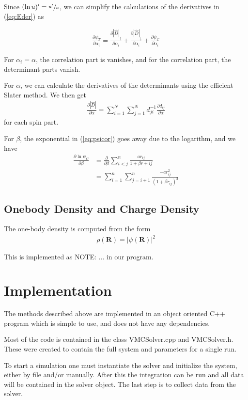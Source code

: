 \documentclass[twocolumns, a4paper,11pt,fleqn]{extarticle}
\newcommand{\eq}[1]{{\small\begin{align*}#1\end{align*}}}
\renewcommand\vec[1]{\boldsymbol{\mathbf{#1}}}
\newcommand{\op}[1]{\hat{#1}}
\begin{document}
Since $(\ln u)' = \sfrac{u'}{u}$, we can simplify the calculations of the derivatives
in (\ref{eq:Eder}) as

\eq{
  \frac{\partial \psi_T}{\partial \alpha_i}
  =\frac{\partial |\op D|_{\uparrow}}{\partial \alpha_i}
  +\frac{\partial |\op D|_{\downarrow}}{\partial \alpha_i}
  +\frac{\partial \psi_C}{\partial \alpha_i}
}

For $\alpha_i = \alpha$, the correlation part is vanishes,
and for the correlation part, the determinant parts vanish.

For $\alpha$, we can calculate the derivatives of the determinants 
using the efficient Slater method.
We then get
\eq{
  \frac{\partial|\op D|}{\partial \alpha}
  =\sum_{i=1}^N \sum_{j=1}^N  d_{ji}^{-1}\frac{\partial d_{ij}}{\partial \alpha}
}
for each spin part.

For $\beta$, the exponential in (\ref{eq:psicor}) 
goes away due to the logarithm, and we have
\eq{
  \frac{\partial \ln \psi_C}{\partial \beta}
  &=\frac{\partial}{\partial \beta}\sum_{i<j}^n
    \frac{a r_{ij}}{1+\beta r+{ij}}\\
    &= \sum_{i=1}^n \sum_{j=i+1}^n \frac{-a r_{ij}^2}{(1+\beta r_{ij})^2}
}

\subsection{Onebody Density and Charge Density}
The one-body density is computed from the form 
{\small
\eq{
	\rho(\vec R) = |\psi(\vec R)|^2
}}%

This is implemented as NOTE: ... in our program. 

\clearpage

\section{Implementation}
The methods described above are implemented in an object oriented C++ program
which is simple to use, and does not have any dependencies. 

Most of the code is contained in the class VMCSolver.cpp and VMCSolver.h. 
These were created to contain the full system and parameters for a single run. 

To start a simulation one must instantiate the solver and 
initialize the system, either by file and/or manually. After this
the integration can be run and all data will be contained in the solver object.
The last step is to collect data from the solver. 
\end{document}
